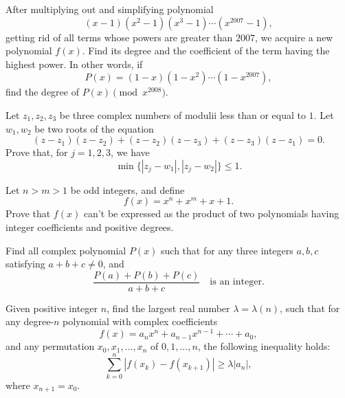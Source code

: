 \begin{question}[name={2008 China TST}]
    After multiplying out and simplifying polynomial \[(x - 1)(x^2 - 1)(x^3 - 1)\cdots(x^{2007} - 1),\] getting rid of all terms whose powers are greater than $2007$, we acquire a new polynomial $f(x)$. Find its degree and the coefficient of the term having the highest power. In other words, if \[P(x) = (1 - x)(1 - x^{2})\cdots(1 - x^{2007}),\] find the degree of $P(x) \pmod {x^{2008}}$.
\end{question}

\begin{question}[name={2008 China TST}]
    Let $ z_{1},z_{2},z_{3}$ be three complex numbers of modulii less than or equal to $1$. Let $ w_{1},w_{2}$ be two roots of the equation \[(z - z_{1})(z - z_{2}) + (z - z_{2})(z - z_{3}) + (z - z_{3})(z - z_{1}) = 0.\] Prove that, for $ j = 1,2,3$, we have \[\min\{|z_{j} - w_{1}|,|z_{j} - w_{2}|\}\leq 1.\]
\end{question}


\begin{question}[name={2008 China TST}]
    Let $n>m>1$ be odd integers, and define \[f(x)=x^n+x^m+x+1.\] Prove that $f(x)$ can't be expressed as the product of two polynomials having integer coefficients and positive degrees.
\end{question}



\begin{question}[name={2009 China TST}]
    Find all complex polynomial $P(x)$ such that for any three integers $a,b,c$ satisfying $ a + b + c\not = 0$, and \[\displaystyle \frac{P(a) + P(b) + P(c)}{a + b + c} \quad \text{is an integer.}\]
\end{question}


\begin{question}[name={2010 China TST}]
    Given positive integer $n$, find the largest real number $\lambda=\lambda(n)$, such that for any degree-$n$ polynomial with complex coefficients \[f(x)=a_n x^n+a_{n-1} x^{n-1}+\cdots+a_0,\] and any permutation $x_0,x_1,\dots,x_n$ of $0,1,\dots,n$, the following inequality holds: \[\sum_{k=0}^n|f(x_k)-f(x_{k+1})|\geq \lambda |a_n|,\] where $x_{n+1}=x_0$.
\end{question}


